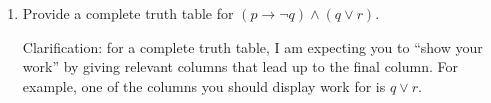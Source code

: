 \documentclass{article}
\begin{document}
\begin{enumerate}
\item Provide a complete truth table for $(p \rightarrow \neg q) \wedge (q \vee r)$.

Clarification: for a complete truth table, I am expecting you to ``show your work'' by giving relevant columns that lead up to the final column. For example, one of the columns you should display work for is $q \vee r$.

\end{enumerate}
\end{document}
